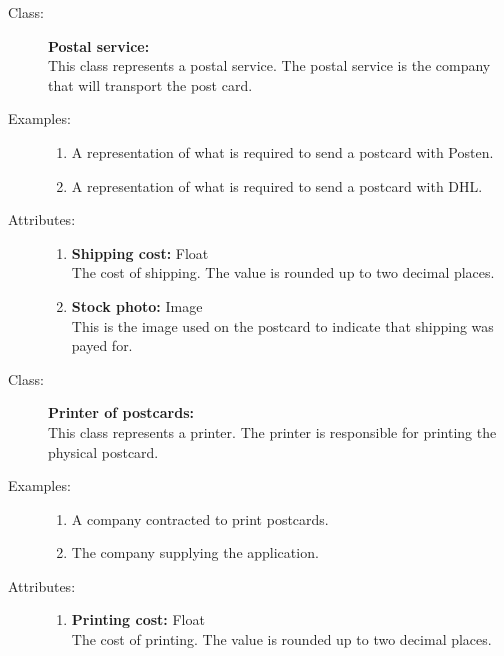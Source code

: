 \documentclass[10pt,a4paper]{article}
\begin{document}
\hrulefill

\begin{description}
\item[Class:] \textbf{Postal service:} \hfill \\
This class represents a postal service. The postal service is the company that will transport the post card. 

\item[Examples:] \hfill
\begin{enumerate}
\item A representation of what is required to send a postcard with Posten.
\item A representation of what is required to send a postcard with DHL.
\end{enumerate}

\item[Attributes:] \hfill
\begin{enumerate}
\item \textbf{Shipping cost:} Float \hfill \\The cost of shipping. The value is rounded up to two decimal places.
\item \textbf{Stock photo:} Image \hfill \\This is the image used on the postcard to indicate that shipping was payed for.
\end{enumerate}
\end{description}

\hrulefill

\begin{description}
\item[Class:] \textbf{Printer of postcards:} \hfill \\
This class represents a printer. The printer is responsible for printing the physical postcard. 

\item[Examples:] \hfill
\begin{enumerate}
\item A company contracted to print postcards.
\item The company supplying the application.
\end{enumerate}

\item[Attributes:] \hfill
\begin{enumerate}
\item \textbf{Printing cost:} Float \hfill \\The cost of printing. The value is rounded up to two decimal places.
\end{enumerate}
\end{description}
\end{document}
